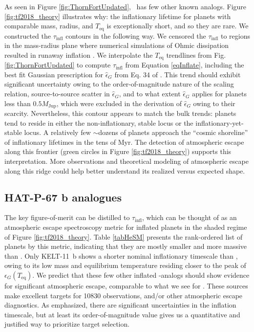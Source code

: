 \documentclass[twocolumn]{aastex631}
\newcommand{\hatpb}{\object{HAT-P-67 b}}
\begin{document}
As seen in Figure \ref{fig:ThornFortUpdated}, \hatpb~has few other known analogs.  Figure \ref{fig:tf2018_theory} illustrates why: the inflationary lifetime for planets with comparable mass, radius, and $T_\mathrm{eq}$ is exceptionally short, and so they are rare.  We constructed the $\tau_\mathrm{infl}$ contours in the following way.  We censored the $\tau_\mathrm{infl}$ to regions in the mass-radius plane where numerical simulations of Ohmic dissipation resulted in runaway inflation \citet{2011ApJ...738....1B}.  We interpolate the $T_\mathrm{eq}$ trendlines from Fig. \ref{fig:ThornFortUpdated} to compute $\tau_\mathrm{infl}$ from Equation \ref{eqInflate}, including the best fit Gaussian prescription for $\hat{\epsilon}_G$ from Eq. 34 of \citet{2018AJ....155..214T}.  This trend should exhibit significant uncertainty owing to the order-of-magnitude nature of the scaling relation, source-to-source scatter in $\hat{\epsilon}_G$, and to what extent $\hat{\epsilon}_G$ applies for planets less than $0.5 M_\mathrm{Jup}$, which were excluded in the derivation of $\hat{\epsilon}_G$ owing to their scarcity.  Nevertheless, this contour appears to match the bulk trends: planets tend to reside in either the non-inflationary, stable locus or the inflationary-yet-stable locus.  A relatively few $\sim$dozens of planets approach the ``cosmic shoreline'' of inflationary lifetimes in the tens of Myr. The detection of atmospheric escape along this frontier (green circles in Figure \ref{fig:tf2018_theory}) supports this interpretation.  More observations and theoretical modeling of atmospheric escape along this ridge could help better understand its realized versus expected shape.

\subsection{HAT-P-67 b analogues}

The key figure-of-merit can be distilled to $\tau_\mathrm{infl}$, which can be thought of as an atmospheric escape spectroscopy metric \citep{2018PASP..130k4401K} for inflated planets in the shaded regime of Figure \ref{fig:tf2018_theory}.  Table \ref{tabHeSM} presents the rank-ordered list of planets by this metric, indicating that they are mostly smaller and more massive than \hatpb.  Only KELT-11~b shows a shorter nominal inflationary timescale than \hatpb, owing to its low mass and equilibrium temperature residing closer to the peak of $\epsilon_G(T_\mathrm{eq})$.  We predict that these few other inflated \hatpb-analogs should show evidence for significant atmospheric escape, comparable to what we see for \hatpb.  These sources make excellent targets for  10830 observations, and/or other atmospheric escape diagnostics.  As emphasized, there are significant uncertainties in the inflation timescale, but at least its order-of-magnitude value gives us a quantitative and justified way to prioritize target selection.
\end{document}
